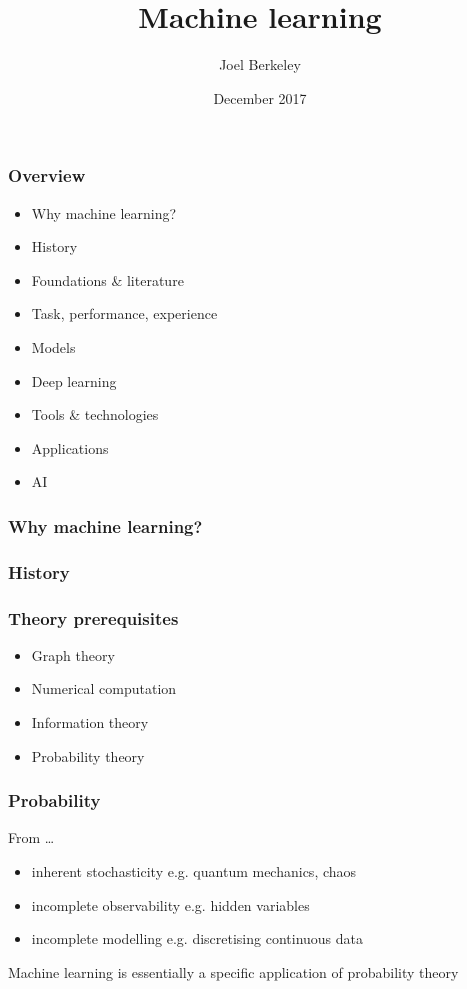 \documentclass[xcolor={dvipsnames}]{beamer}
\author{Joel Berkeley}
\title{Machine learning}
\institute{Verimatrix Bristol}
\date{December 2017}
\begin{document}
\begin{frame}
  \maketitle
\end{frame}

\begin{frame}
  \frametitle{Overview}
  \begin{itemize}
    \item<+-> Why machine learning?
    \item<+-> History
    \item<+-> Foundations \& literature
    \item<+-> Task, performance, experience
    \item<+-> Models
    \item<+-> Deep learning
    \item<+-> Tools \& technologies
    \item<+-> Applications
    \item<+-> AI
  \end{itemize}
\end{frame}

\begin{frame}
  \frametitle{Why machine learning?}
\end{frame}

\begin{frame}
  \frametitle{History}
\end{frame}

\begin{frame}
  \frametitle{Theory prerequisites}
  \begin{itemize}
    \item<+-> Graph theory
    \item<+-> Numerical computation
    \item<+-> Information theory
    \item<+-> Probability theory
  \end{itemize}
\end{frame}

\begin{frame}
  \frametitle{Probability}
  From \ldots\
  \begin{itemize}
    \item<+-> inherent stochasticity e.g. quantum mechanics, chaos
    \item<+-> incomplete observability e.g. hidden variables
    \item<+-> incomplete modelling e.g. discretising continuous data
  \end{itemize}
  Machine learning is essentially a specific application of probability theory
\end{frame}
\end{document}

